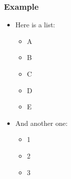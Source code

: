 \documentclass{beamer}
\begin{document}
\begin{frame}
\frametitle{Example}
\begin{itemize}
    \item Here is a list:
    \begin{itemize}
        \item A
        \item B
        \item C
        \item D
        \item E
    \end{itemize}
    \item And another one:
    \begin{itemize}
        \item 1
        \item 2
        \item 3
    \end{itemize}
\end{itemize}
\end{frame}

\setcounter{finalframe}{\value{framenumber}}
\end{document}

